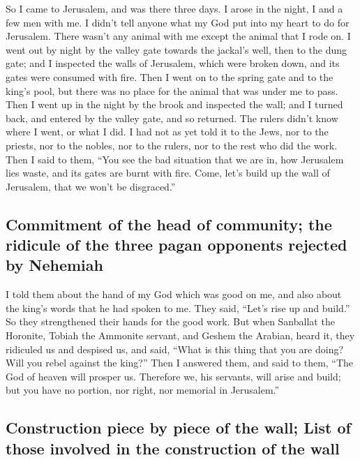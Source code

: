  So I came to Jerusalem, and was there three days.
 I arose in the night, I and a few men with me. I didn't
tell anyone what my God put into my heart to do for Jerusalem. There
wasn't any animal with me except the animal that I rode on.
 I went out by night by the valley gate towards the
jackal's well, then to the dung gate; and I inspected the walls of
Jerusalem, which were broken down, and its gates were consumed with
fire.  Then I went on to the spring gate and to the
king's pool, but there was no place for the animal that was under me to
pass.  Then I went up in the night by the brook and
inspected the wall; and I turned back, and entered by the valley gate,
and so returned.  The rulers didn't know where I went, or
what I did. I had not as yet told it to the Jews, nor to the priests,
nor to the nobles, nor to the rulers, nor to the rest who did the work.
 Then I said to them, ``You see the bad situation that we
are in, how Jerusalem lies waste, and its gates are burnt with fire.
Come, let's build up the wall of Jerusalem, that we won't be
disgraced.''

\hypertarget{commitment-of-the-head-of-community-the-ridicule-of-the-three-pagan-opponents-rejected-by-nehemiah}{%
\subsection{Commitment of the head of community; the ridicule of the
three pagan opponents rejected by
Nehemiah}\label{commitment-of-the-head-of-community-the-ridicule-of-the-three-pagan-opponents-rejected-by-nehemiah}}

 I told them about the hand of my God which was good on
me, and also about the king's words that he had spoken to me. They said,
``Let's rise up and build.'' So they strengthened their hands for the
good work.  But when Sanballat the Horonite, Tobiah the
Ammonite servant, and Geshem the Arabian, heard it, they ridiculed us
and despised us, and said, ``What is this thing that you are doing? Will
you rebel against the king?''  Then I answered them, and
said to them, ``The God of heaven will prosper us. Therefore we, his
servants, will arise and build; but you have no portion, nor right, nor
memorial in Jerusalem.''

\hypertarget{construction-piece-by-piece-of-the-wall-list-of-those-involved-in-the-construction-of-the-wall}{%
\subsection{Construction piece by piece of the wall; List of those
involved in the construction of the
wall}\label{construction-piece-by-piece-of-the-wall-list-of-those-involved-in-the-construction-of-the-wall}}

